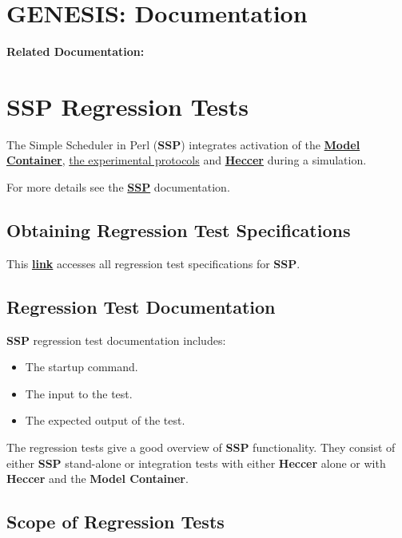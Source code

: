 \documentclass[12pt]{article}
\begin{document}
\section*{GENESIS: Documentation}

{\bf Related Documentation:}

\section*{SSP Regression Tests}

The Simple Scheduler in Perl ({\bf SSP}) integrates activation of the
\href{../model-container/model-container.tex}{\bf Model Container},
\href{../experiment/experiment.tex}{the experimental protocols} and
\href{../heccer/heccer.tex}{\bf Heccer} during a simulation.

For more details see the \href{../ssp/ssp.tex}{\bf SSP} documentation.

\subsection*{Obtaining Regression Test Specifications}

This \href{http://www.neurospaces.org/neurospaces_project/ssp/tests/html/index.html}{\bf link} accesses all regression test specifications for {\bf SSP}.

\subsection*{Regression Test Documentation}

{\bf SSP} regression test documentation includes:
\begin{itemize}
\item The startup command.
\item The input to the test.
\item The expected output of the test.
\end{itemize}
The regression tests give a good overview of {\bf SSP} functionality. They consist of either {\bf SSP} stand-alone or integration tests with either {\bf Heccer} alone or with {\bf Heccer} and the {\bf Model Container}.

\subsection*{Scope of Regression Tests}
\end{document}
